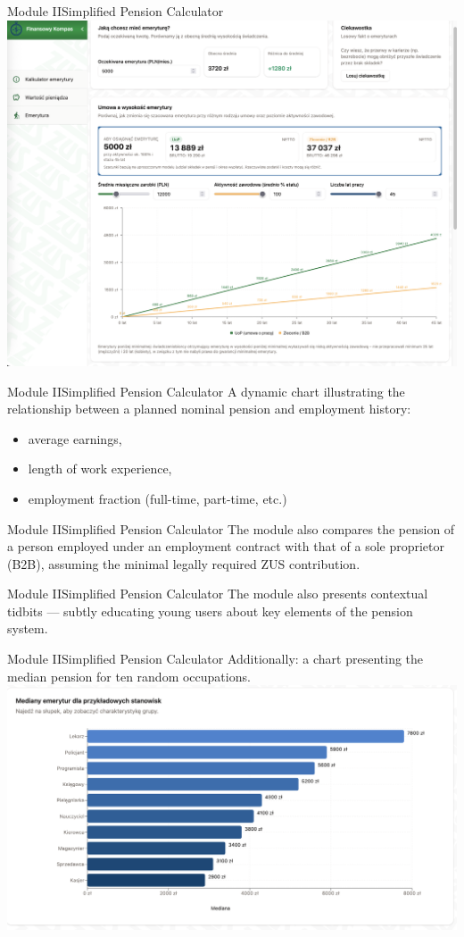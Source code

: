 \begin{frame}[t]{Module II}{Simplified Pension Calculator}
  \includegraphics[width=.8\textwidth]{img/module_2_simple_pension_calculator}
\end{frame}

\begin{frame}[t]{Module II}{Simplified Pension Calculator}
A dynamic chart illustrating the relationship between a planned nominal pension and employment history:
\begin{itemize}
  \item average earnings,
  \item length of work experience,
  \item employment fraction (full-time, part-time, etc.)
\end{itemize}
\end{frame}

\begin{frame}[t]{Module II}{Simplified Pension Calculator}
The module also compares the pension of a person employed under an employment contract
with that of a sole proprietor (B2B),
assuming the minimal legally required ZUS contribution.
\end{frame}

\begin{frame}[t]{Module II}{Simplified Pension Calculator}
The module also presents contextual tidbits ---
subtly educating young users about key elements of the pension system.
\end{frame}

\begin{frame}[t]{Module II}{Simplified Pension Calculator}
Additionally: a chart presenting the median pension for ten random occupations.
\\[2em]
\includegraphics[width=.8\textwidth]{img/module_2b_median_pensions}
\end{frame}

